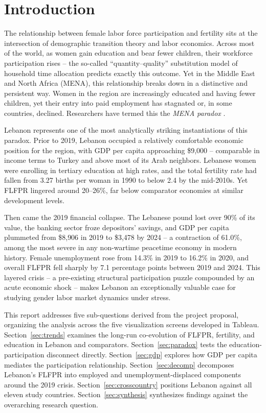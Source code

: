 \documentclass[12pt,a4paper]{article}
\begin{document}
\tableofcontents
\newpage

\section{Introduction}
\label{sec:intro}

The relationship between female labor force participation and fertility sits at the intersection of demographic transition theory and labor economics. Across most of the world, as women gain education and bear fewer children, their workforce participation rises -- the so-called ``quantity--quality'' substitution model of household time allocation predicts exactly this outcome. Yet in the Middle East and North Africa (MENA), this relationship breaks down in a distinctive and persistent way. Women in the region are increasingly educated and having fewer children, yet their entry into paid employment has stagnated or, in some countries, declined. Researchers have termed this the \textit{MENA paradox} \citep{assaad2020}.

Lebanon represents one of the most analytically striking instantiations of this paradox. Prior to 2019, Lebanon occupied a relatively comfortable economic position for the region, with GDP per capita approaching \$9{,}000 -- comparable in income terms to Turkey and above most of its Arab neighbors. Lebanese women were enrolling in tertiary education at high rates, and the total fertility rate had fallen from 3.27 births per woman in 1990 to below 2.4 by the mid-2010s. Yet FLFPR lingered around 20--26\%, far below comparator economies at similar development levels.

Then came the 2019 financial collapse. The Lebanese pound lost over 90\% of its value, the banking sector froze depositors' savings, and GDP per capita plummeted from \$8{,}906 in 2019 to \$3{,}478 by 2024 -- a contraction of 61.0\%, among the most severe in any non-wartime peacetime economy in modern history. Female unemployment rose from 14.3\% in 2019 to 16.2\% in 2020, and overall FLFPR fell sharply by 7.1 percentage points between 2019 and 2024. This layered crisis -- a pre-existing structural participation puzzle compounded by an acute economic shock -- makes Lebanon an exceptionally valuable case for studying gender labor market dynamics under stress.

This report addresses five sub-questions derived from the project proposal, organizing the analysis across the five visualization screens developed in Tableau. Section~\ref{sec:trends} examines the long-run co-evolution of FLFPR, fertility, and education in Lebanon and comparators. Section~\ref{sec:paradox} tests the education-participation disconnect directly. Section~\ref{sec:gdp} explores how GDP per capita mediates the participation relationship. Section~\ref{sec:decomp} decomposes Lebanon's FLFPR into employed and unemployment-displaced components around the 2019 crisis. Section~\ref{sec:crosscountry} positions Lebanon against all eleven study countries. Section~\ref{sec:synthesis} synthesizes findings against the overarching research question.
\end{document}
